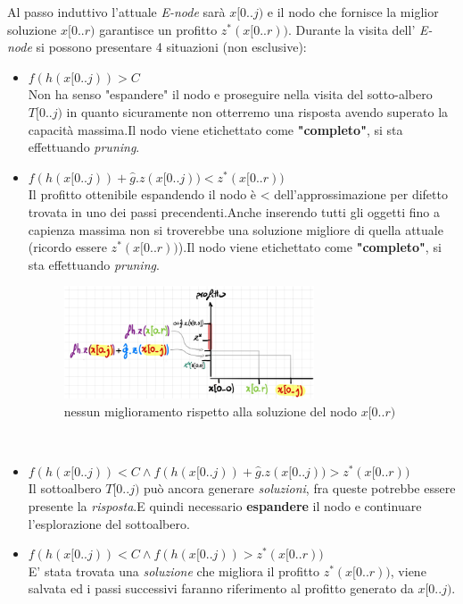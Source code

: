 \documentclass[a4paper]{article}
\begin{document}
\begin{adjustwidth}{.8cm}{0cm}
	Al passo induttivo l'attuale \textit{E-node} sarà $x[0..j)$ e il nodo che fornisce la miglior soluzione $x[0..r)$ garantisce un profitto $z^*(x[0..r))$.
	Durante la visita dell' \textit{E-node} si possono presentare 4 situazioni (non esclusive):
	\begin{itemize}
		\item $f(h(x[0..j)) > C$\\
			Non ha senso "espandere" il nodo e proseguire nella visita del sotto-albero $T[0..j)$ in quanto sicuramente non otterremo una risposta avendo superato la capacità massima.Il nodo viene etichettato come \textbf{"completo"}, si sta effettuando \textit{pruning}.
		\item$f(h(x[0..j)) + \hat{g}.z(x[0..j)) < z^*(x[0..r))$\\
			Il profitto ottenibile espandendo il nodo è < dell'approssimazione per difetto trovata in uno dei passi precendenti.Anche inserendo tutti gli oggetti fino a capienza massima non si troverebbe una soluzione migliore di quella attuale (ricordo essere $z^*(x[0..r))$).Il nodo viene etichettato come \textbf{"completo"}, si sta effettuando \textit{pruning}.
\begin{figure}[!ht]
\centering
\includegraphics[width=0.7\textwidth]{./img/C14_item2.png}
\caption{nessun miglioramento rispetto alla soluzione del nodo $x[0..r)$} \label{FIG:C14_item2}
\end{figure}\\
		\item $f(h(x[0..j)) < C \land f(h(x[0..j)) + \hat{g}.z(x[0..j)) > z^*(x[0..r))$\\
			Il sottoalbero $T[0..j)$ può ancora generare \textit{soluzioni}, fra queste potrebbe essere presente la \textit{risposta}.E quindi necessario \textbf{espandere} il nodo e continuare l'esplorazione del sottoalbero.
		\item $f(h(x[0..j)) < C \land f(h(x[0..j)) > z^*(x[0..r))$\\
			E' stata trovata una \textit{soluzione} che migliora il profitto $z^*(x[0..r))$, viene salvata ed i passi successivi faranno riferimento al profitto generato da $x[0..j)$.

\end{itemize}
\end{adjustwidth}
\end{document}
